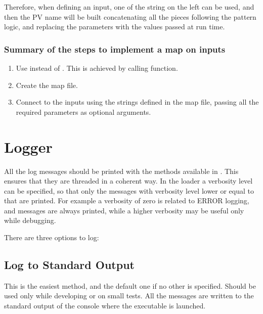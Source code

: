 \documentclass[letterpaper,10pt,english]{sphinxmanual}
\begin{document}
Therefore, when defining an input, one of the string on the left can be used,
and then the PV name will be built concatenating all the pieces following the
pattern logic, and replacing the parameters with the values passed at run time.


\subsubsection{Summary of the steps to implement a map on inputs}
\label{\detokenize{io:summary-of-the-steps-to-implement-a-map-on-inputs}}\begin{enumerate}
\item {} 
Use {\hyperref[\detokenize{io:mappedIOs}]{}} instead of {\hyperref[\detokenize{io:fsmIOs}]{}}. This is achieved by calling  function.

\item {} 
Create the map file.

\item {} 
Connect to the inputs using the strings defined in the map file, passing all the required parameters as optional arguments.

\end{enumerate}


\section{Logger}
\label{\detokenize{logger:logger}}\label{\detokenize{logger:id1}}\label{\detokenize{logger::doc}}
All the log messages should be printed with the methods available in
{\hyperref[\detokenize{fsm:fsmBase}]{}}. This ensures that they are threaded in a coherent way. In the
loader a verbosity level can be specified, so that only the messages with
verbosity level lower or equal to that are printed. For example a verbosity of
zero is related to ERROR logging, and messages are always printed, while a
higher verbosity may be useful only while debugging.

There are three options to log:


\subsection{Log to Standard Output}
\label{\detokenize{logger:log-to-standard-output}}
This is the easiest method, and the default one if no other is specified. Should
be used only while developing or on small tests. All the messages are written to
the standard output of the console where the executable is launched.
\end{document}
